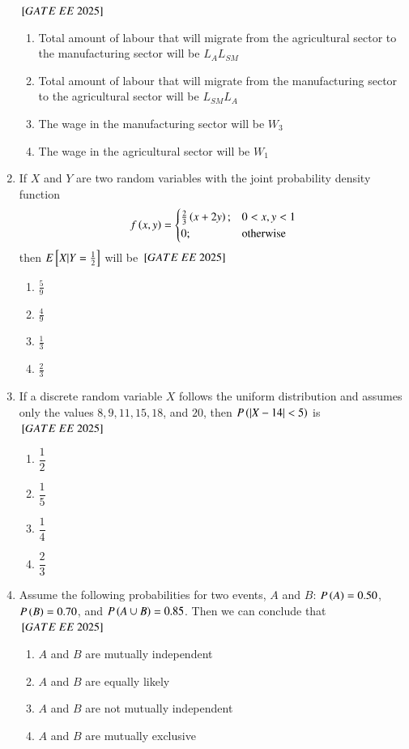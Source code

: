 \documentclass[journal,12pt,onecolumn]{IEEEtran}
\theoremstyle{remark}
\begin{document}
\begin{enumerate}
\vspace{0.2cm}
$\sbrak{GATE\ EE\ 2025}$\\
\begin{enumerate}[label=(\Alph*)]
    \item Total amount of labour that will migrate from the agricultural sector to the manufacturing sector will be $L_A L_{SM}$
    \item Total amount of labour that will migrate from the manufacturing sector to the agricultural sector will be $L_{SM} L_A$
    \item The wage in the manufacturing sector will be $W_3$
    \item The wage in the agricultural sector will be $W_1$
\end{enumerate}
 
\item If $X$ and $Y$ are two random variables with the joint probability density function
\[
f \left(x, y\right) =
\begin{cases}
\frac{2}{3} \left(x + 2y\right); & 0 < x, y < 1 \\
0; & \text{otherwise}
\end{cases}
\]
then $E{}\left[X|Y=\frac{1}{2}\right]$ will be
$\sbrak{GATE\ EE\ 2025}$\\
\begin{enumerate}[label=(\Alph*)]
    \item $\frac{5}{9}$
    \item $\frac{4}{9}$
    \item $\frac{1}{3}$
    \item $\frac{2}{3}$
\end{enumerate}
 
\item If a discrete random variable $X$ follows the uniform distribution and assumes only the values $8, 9, 11, 15, 18$, and $20$, then $P \left(|X - 14| < 5\right)$ is
$\sbrak{GATE\ EE\ 2025}$\\
\begin{enumerate}[label=(\Alph*)]
    \item $\dfrac{1}{2}$
    \item $\dfrac{1}{5}$
    \item $\dfrac{1}{4}$
    \item $\dfrac{2}{3}$
\end{enumerate}
 
\item Assume the following probabilities for two events, $A$ and $B$: $P \left(A\right) = 0.50$, $P \left(B\right) = 0.70$, and $P \left(A \cup B\right) = 0.85$. Then we can conclude that
$\sbrak{GATE\ EE\ 2025}$\\
\begin{enumerate}[label=(\Alph*)]
    \item $A$ and $B$ are mutually independent
    \item $A$ and $B$ are equally likely
    \item $A$ and $B$ are not mutually independent
    \item $A$ and $B$ are mutually exclusive
\end{enumerate}
 

\end{enumerate}
\end{document}
